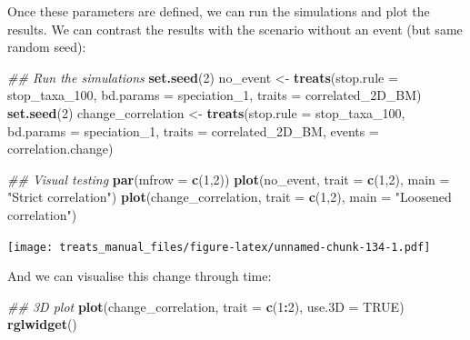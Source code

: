 \documentclass[
]{book}
\newenvironment{Shaded}{\begin{snugshade}}{\end{snugshade}}
\newcommand{\CommentTok}[1]{\textcolor[rgb]{0.56,0.35,0.01}{\textit{#1}}}
\newcommand{\DataTypeTok}[1]{\textcolor[rgb]{0.13,0.29,0.53}{#1}}
\newcommand{\DecValTok}[1]{\textcolor[rgb]{0.00,0.00,0.81}{#1}}
\newcommand{\KeywordTok}[1]{\textcolor[rgb]{0.13,0.29,0.53}{\textbf{#1}}}
\newcommand{\NormalTok}[1]{#1}
\newcommand{\OperatorTok}[1]{\textcolor[rgb]{0.81,0.36,0.00}{\textbf{#1}}}
\newcommand{\OtherTok}[1]{\textcolor[rgb]{0.56,0.35,0.01}{#1}}
\newcommand{\StringTok}[1]{\textcolor[rgb]{0.31,0.60,0.02}{#1}}
\begin{document}
Once these parameters are defined, we can run the simulations and plot the results.
We can contrast the results with the scenario without an event (but same random seed):

\begin{Shaded}
\begin{Highlighting}[]
\CommentTok{\#\# Run the simulations}
\KeywordTok{set.seed}\NormalTok{(}\DecValTok{2}\NormalTok{)}
\NormalTok{no\_event \textless{}{-}}\StringTok{ }\KeywordTok{treats}\NormalTok{(}\DataTypeTok{stop.rule =}\NormalTok{ stop\_taxa\_}\DecValTok{100}\NormalTok{,}
                 \DataTypeTok{bd.params =}\NormalTok{ speciation\_}\DecValTok{1}\NormalTok{,}
                 \DataTypeTok{traits    =}\NormalTok{ correlated\_2D\_BM)}
\KeywordTok{set.seed}\NormalTok{(}\DecValTok{2}\NormalTok{)}
\NormalTok{change\_correlation \textless{}{-}}\StringTok{ }\KeywordTok{treats}\NormalTok{(}\DataTypeTok{stop.rule =}\NormalTok{ stop\_taxa\_}\DecValTok{100}\NormalTok{,}
                           \DataTypeTok{bd.params =}\NormalTok{ speciation\_}\DecValTok{1}\NormalTok{,}
                           \DataTypeTok{traits    =}\NormalTok{ correlated\_2D\_BM,}
                           \DataTypeTok{events    =}\NormalTok{ correlation.change)}

\CommentTok{\#\# Visual testing}
\KeywordTok{par}\NormalTok{(}\DataTypeTok{mfrow =} \KeywordTok{c}\NormalTok{(}\DecValTok{1}\NormalTok{,}\DecValTok{2}\NormalTok{))}
\KeywordTok{plot}\NormalTok{(no\_event, }\DataTypeTok{trait =} \KeywordTok{c}\NormalTok{(}\DecValTok{1}\NormalTok{,}\DecValTok{2}\NormalTok{), }\DataTypeTok{main =} \StringTok{"Strict correlation"}\NormalTok{)}
\KeywordTok{plot}\NormalTok{(change\_correlation, }\DataTypeTok{trait =} \KeywordTok{c}\NormalTok{(}\DecValTok{1}\NormalTok{,}\DecValTok{2}\NormalTok{), }\DataTypeTok{main =} \StringTok{"Loosened correlation"}\NormalTok{)}
\end{Highlighting}
\end{Shaded}

\texttt{[image: treats\_manual\_files/figure-latex/unnamed-chunk-134-1.pdf]}

And we can visualise this change through time:

\begin{Shaded}
\begin{Highlighting}[]
\CommentTok{\#\# 3D plot}
\KeywordTok{plot}\NormalTok{(change\_correlation, }\DataTypeTok{trait =} \KeywordTok{c}\NormalTok{(}\DecValTok{1}\OperatorTok{:}\DecValTok{2}\NormalTok{), }\DataTypeTok{use.3D =} \OtherTok{TRUE}\NormalTok{)}
\KeywordTok{rglwidget}\NormalTok{()}
\end{Highlighting}
\end{Shaded}
\end{document}
